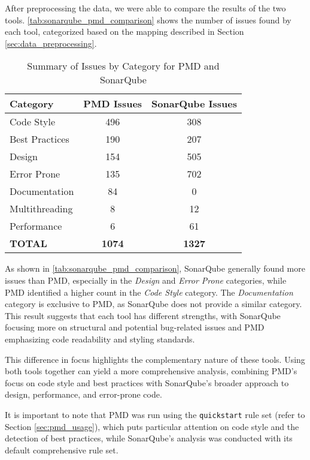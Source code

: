 After preprocessing the data, we were able to compare the results of the two tools. \autoref{tab:sonarqube_pmd_comparison} shows the number of issues found by each tool, categorized based on the mapping described in Section \ref{sec:data_preprocessing}.

\begin{table}[H]
  \centering
  \begin{tabular}{|l|c|c|}
  \hline
  \textbf{Category} & \textbf{PMD Issues} & \textbf{SonarQube Issues} \\
  \hline
  Code Style           & 496 & 308 \\
  Best Practices       & 190 & 207 \\
  Design               & 154 & 505 \\
  Error Prone          & 135 & 702 \\
  Documentation        & 84  & 0 \\
  Multithreading       & 8   & 12 \\
  Performance          & 6   & 61 \\
  \textbf{TOTAL}       & \textbf{1074} & \textbf{1327} \\
  \hline
  \end{tabular}
  \caption{Summary of Issues by Category for PMD and SonarQube}
  \label{tab:sonarqube_pmd_comparison}
\end{table}

\noindent As shown in \autoref{tab:sonarqube_pmd_comparison}, SonarQube generally found more issues than PMD, especially in the \textit{Design} and \textit{Error Prone} categories, while PMD identified a higher count in the \textit{Code Style} category. The \textit{Documentation} category is exclusive to PMD, as SonarQube does not provide a similar category. This result suggests that each tool has different strengths, with SonarQube focusing more on structural and potential bug-related issues and PMD emphasizing code readability and styling standards.

This difference in focus highlights the complementary nature of these tools. Using both tools together can yield a more comprehensive analysis, combining PMD's focus on code style and best practices with SonarQube's broader approach to design, performance, and error-prone code.

It is important to note that PMD was run using the \texttt{quickstart} rule set (refer to Section \ref{sec:pmd_usage}), which puts particular attention on code style and the detection of best practices, while SonarQube’s analysis was conducted with its default comprehensive rule set. 

